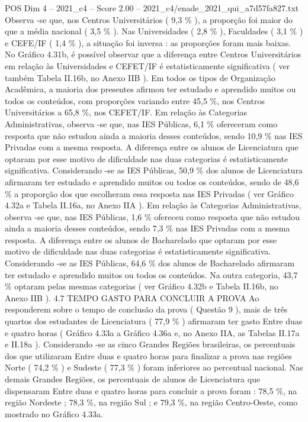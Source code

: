 \begin{textsample}{POS Dim 4 – 2021\_c4 – Score 2.00 – 2021\_c4/enade\_2021\_qui\_a7d57fa827.txt}
Observa -se que, nos Centros Universitários ( 9,3 \% ), a proporção foi maior do que a média nacional ( 3,5 \% ).
Nas Universidades ( 2,8 \% ), Faculdades ( 3,1 \% ) e CEFE/IF ( 1,4 \% ), a situação foi inversa : as proporções foram mais baixas.
No Gráfico 4.31b, é possível observar que a diferença entre Centros Universitários em relação às Universidades e CEFET/IF é estatisticamente significativa ( ver também Tabela II.16b, no Anexo IIB ).
Em todos os tipos de Organização Acadêmica, a maioria dos presentes afirmou ter estudado e aprendido muitos ou todos os conteúdos, com proporções variando entre 45,5 \%, nos Centros Universitários a 65,8 \%, nos CEFET/IF.
Em relação às Categorias Administrativas, observa -se que, nas IES Públicas, 6,1 \% ofereceram como resposta que não estudou ainda a maioria desses conteúdos, sendo 10,9 \% nas IES Privadas com a mesma resposta.
A diferença entre os alunos de Licenciatura que optaram por esse motivo de dificuldade nas duas categorias é estatisticamente significativa.
Considerando -se as IES Públicas, 50,9 \% dos alunos de Licenciatura afirmaram ter estudado e aprendido muitos ou todos os conteúdos, sendo de 48,6 \% a proporção dos que escolheram essa resposta nas IES Privadas ( ver Gráfico 4.32a e Tabela II.16a, no Anexo IIA ).
Em relação às Categorias Administrativas, observa -se que, nas IES Públicas, 1,6 \% ofereceu como resposta que não estudou ainda a maioria desses conteúdos, sendo 7,3 \% nas IES Privadas com a mesma resposta.
A diferença entre os alunos de Bacharelado que optaram por esse motivo de dificuldade nas duas categorias é estatisticamente significativa.
Considerando -se as IES Públicas, 64,6 \% dos alunos de Bacharelado afirmaram ter estudado e aprendido muitos ou todos os conteúdos.
Na outra categoria, 43,7 \% optaram pelas mesmas categorias ( ver Gráfico 4.32b e Tabela II.16b, no Anexo IIB ). 4.7 TEMPO GASTO PARA CONCLUIR A PROVA Ao responderem sobre o tempo de conclusão da prova ( Questão 9 ), mais de três quartos dos estudantes de Licenciatura ( 77,9 \% ) afirmaram ter gasto Entre duas e quatro horas ( Gráfico 4.33a a Gráfico 4.36a e, no Anexo IIA, as Tabelas II.17a e II.18a ).
Considerando -se as cinco Grandes Regiões brasileiras, os percentuais dos que utilizaram Entre duas e quatro horas para finalizar a prova nas regiões Norte ( 74,2 \% ) e Sudeste ( 77,3 \% ) foram inferiores ao percentual nacional.
Nas demais Grandes Regiões, os percentuais de alunos de Licenciatura que dispensaram Entre duas e quatro horas para concluir a prova foram : 78,5 \%, na região Nordeste ; 78,3 \%, na região Sul ; e 79,3 \%, na região Centro-Oeste, como mostrado no Gráfico 4.33a.

\end{textsample}
